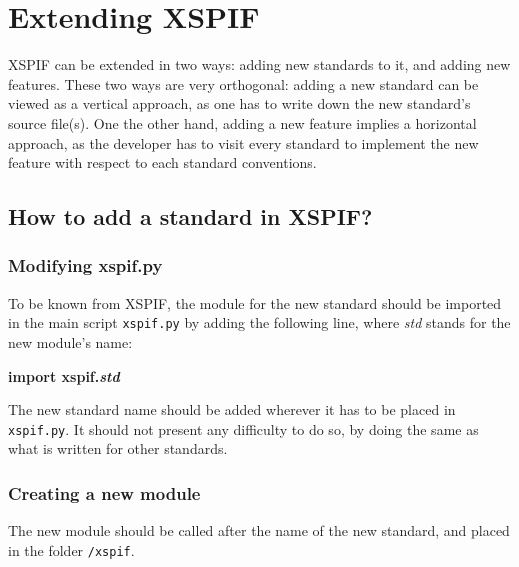 

\chapter{Extending XSPIF}

\noindent XSPIF can be extended in two ways: adding new standards to it, and adding new features. These two ways are very orthogonal: adding a new standard can be viewed as a vertical approach, as one has to write down the new standard's source file(s). One the other hand, adding a new feature implies a horizontal approach, as the developer has to visit every standard to implement the new feature with respect to each standard conventions.

\section{How to add a standard in XSPIF?}

\subsection{Modifying xspif.py}
\noindent To be known from XSPIF, the module for the new standard should be imported in the main script \verb|xspif.py| by adding the following line, where \textit{std} stands for the new module's name:

\begin{center}
\textbf{import xspif.\textit{std}}
\end{center}

\noindent The new standard name should be added wherever it has to be placed in \verb|xspif.py|. It should not present any difficulty to do so, by doing the same as what is written for other standards.

\subsection{Creating a new module}
\noindent The new module should be called after the name of the new standard, and placed in the folder \verb|/xspif|. 

